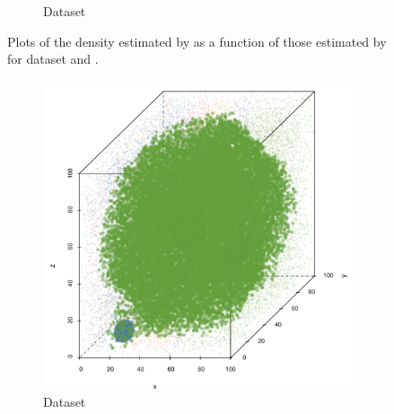 \begin{figure}
\begin{subfigure}{0.23\textwidth}
			\caption{Dataset \baakmanThree}
			\label{fig:discussion:multisphere:mbevssambe:baakman3}
		\end{subfigure}	
		\caption{Plots of the density estimated by \sambe as a function of those estimated by \mbe for dataset %
			\ferdosiTwo and %
			\baakmanTwo.
		}
		\label{fig:discussion:multisphere:four:mbevssambe}
	\end{figure}

	\begin{figure}
		\centering
		\begin{subfigure}{0.23\textwidth}
			\centering
			\includegraphics[keepaspectratio=true, width=\textwidth, height=0.23\textheight]{discussion/img/ferdosi_3_abs_error_mbeSmallerThansambe}
			\caption{Dataset \ferdosiThree}
			\label{fig:discussion:multisphere:mbeLowerError:ferdosi3}
		\end{subfigure}
		\begin{subfigure}{0.23\textwidth}
			\centering

\end{subfigure}
\end{figure}
